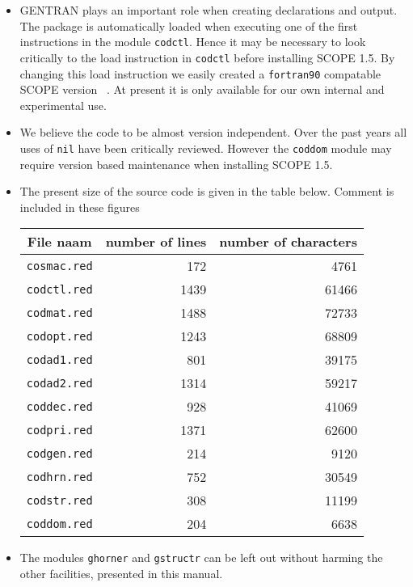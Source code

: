 \begin{itemize}
\item GENTRAN plays an important role when creating declarations and output.
The package is automatically loaded when executing one of the first
instructions in the module {\tt codctl}. Hence it may be necessary to
look critically to the load instruction in {\tt codctl} before installing
SCOPE 1.5. By changing this load instruction we easily created a {\tt fortran90}
compatable SCOPE version ~\cite{Borst:94}. At present it is only available for our own
internal and experimental use.
\item We believe the code to be almost version independent. Over the past
years all uses of {\tt nil} have been critically reviewed. However
the {\tt coddom} module may require version based maintenance when
installing SCOPE 1.5.
\item The present size of the source code is given in the table below.
Comment is included in these figures
\begin{center}
\begin{tabular}{| c | r | r |} \hline
File naam & number of lines & number of characters \\ \hline \hline
{\tt cosmac.red} & 172 & 4761 \\
{\tt codctl.red} & 1439 & 61466 \\
{\tt codmat.red} & 1488 & 72733 \\
{\tt codopt.red} & 1243 & 68809\\
{\tt codad1.red} & 801 & 39175 \\
{\tt codad2.red} & 1314 & 59217 \\
{\tt coddec.red} & 928 & 41069\\
{\tt codpri.red} & 1371 & 62600\\
{\tt codgen.red} & 214 & 9120\\
{\tt codhrn.red} & 752 & 30549\\
{\tt codstr.red} & 308 & 11199\\
{\tt coddom.red} & 204 & 6638\\ \hline
\end{tabular}
\end{center}
\item The modules {\tt ghorner} and {\tt gstructr} can be left out without
harming the other facilities, presented in this manual.
\end{itemize}
\newpage
{}


\newpage
{}
\printindex

